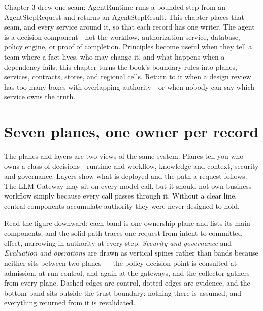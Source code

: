 Chapter 3 drew one seam: AgentRuntime runs a bounded step from an AgentStepRequest and returns an AgentStepResult. This chapter places that seam, and every service around it, so that each record has one writer. The agent is a decision component—not the workflow, authorization service, database, policy engine, or proof of completion. Principles become useful when they tell a team where a fact lives, who may change it, and what happens when a dependency fails; this chapter turns the book's boundary rules into planes, services, contracts, stores, and regional cells. Return to it when a design review has too many boxes with overlapping authority—or when nobody can say which service owns the truth.\par

\section{Seven planes, one owner per record}

The planes and layers are two views of the same system. Planes tell you who owns a class of decisions—runtime and workflow, knowledge and context, security and governance. Layers show what is deployed and the path a request follows. The LLM Gateway may sit on every model call, but it should not own business workflow simply because every call passes through it. Without a clear line, central components accumulate authority they were never designed to hold.\par


Read the figure downward: each band is one ownership plane and lists its main components, and the solid path traces one request from intent to committed effect, narrowing in authority at every step. \emph{Security and governance} and \emph{Evaluation and operations} are drawn as vertical spines rather than bands because neither sits between two planes — the policy decision point is consulted at admission, at run control, and again at the gateways, and the collector gathers from every plane. Dashed edges are control, dotted edges are evidence, and the bottom band sits outside the trust boundary: nothing there is assumed, and everything returned from it is revalidated.\par


